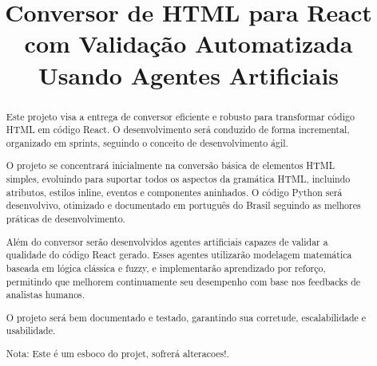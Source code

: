 \documentclass[a4paper, 12pt]{article}
\title{Conversor de HTML para React com Validação Automatizada Usando Agentes Artificiais}
\author{}
\date{}
\begin{document}
\maketitle

\begin{abstract}
Este projeto visa a entrega de conversor eficiente e robusto para transformar código HTML em código React. O desenvolvimento será conduzido de forma incremental, organizado em sprints, seguindo o conceito de desenvolvimento ágil.

O projeto se concentrará inicialmente na conversão básica de elementos HTML simples, evoluindo para suportar todos os aspectos da gramática HTML, incluindo atributos, estilos inline, eventos e componentes aninhados. O código Python será desenvolvivo, otimizado e documentado em português do Brasil seguindo as melhores práticas de desenvolvimento.

Além do conversor serão desenvolvidos agentes artificiais capazes de validar a qualidade do código React gerado. Esses agentes utilizarão modelagem matemática baseada em lógica clássica e fuzzy, e implementarão aprendizado por reforço, permitindo que melhorem continuamente seu desempenho com base nos feedbacks de analistas humanos.

O projeto será bem documentado e testado, garantindo sua corretude, escalabilidade e usabilidade.

Nota: Este é um esboco do projet, sofrerá alteracoes!. 
\end{abstract}
\end{document}
